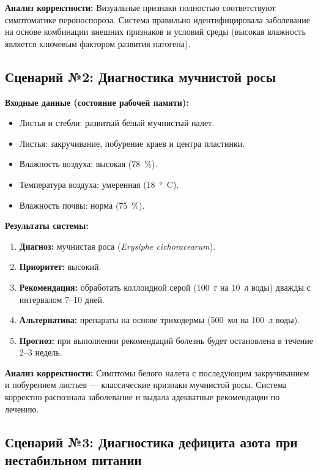 \textbf{Анализ корректности:}
Визуальные признаки полностью соответствуют симптоматике пероноспороза. Система правильно идентифицировала заболевание на основе комбинации внешних признаков и условий среды (высокая влажность является ключевым фактором развития патогена).

\subsection{Сценарий №2: Диагностика мучнистой росы}

\textbf{Входные данные (состояние рабочей памяти):}
\begin{itemize}
    \item Листья и стебли: развитый белый мучнистый налет.
    \item Листья: закручивание, побурение краев и центра пластинки.
    \item Влажность воздуха: высокая (\SI{78}{\%}).
    \item Температура воздуха: умеренная (\SI{18}{\degree C}).
    \item Влажность почвы: норма (\SI{75}{\%}).
\end{itemize}

\textbf{Результаты системы:}
\begin{enumerate}
    \item \textbf{Диагноз:} мучнистая роса (\textit{Erysiphe cichoracearum}).
    \item \textbf{Приоритет:} высокий.
    \item \textbf{Рекомендация:} обработать коллоидной серой (\SI{100}{г} на \SI{10}{л} воды) дважды с интервалом 7--10 дней.
    \item \textbf{Альтернатива:} препараты на основе триходермы (\SI{500}{мл} на \SI{100}{л} воды).
    \item \textbf{Прогноз:} при выполнении рекомендаций болезнь будет остановлена в течение 2--3 недель.
\end{enumerate}

\textbf{Анализ корректности:}
Симптомы белого налета с последующим закручиванием и побурением листьев — классические признаки мучнистой росы. Система корректно распознала заболевание и выдала адекватные рекомендации по лечению.


\subsection{Сценарий №3: Диагностика дефицита азота при нестабильном питании}

